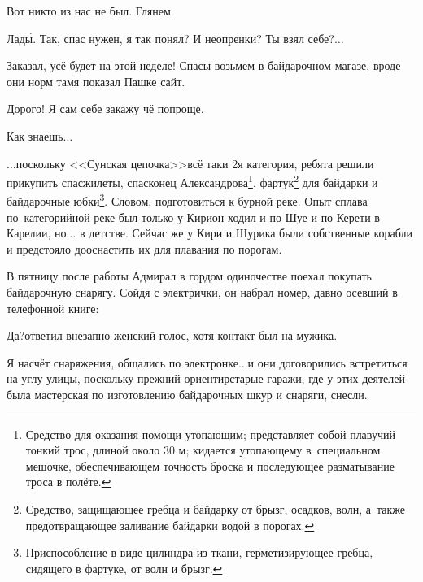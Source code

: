 \diagdash Вот никто из нас не был. Глянем.

\diagdash Лад\'{ы}. Так, спас нужен, я так понял? И неопренки? Ты взял себе?$\ldots$

\diagdash Заказал, усё будет на этой неделе! Спасы возьмем в байдарочном магазе, вроде они норм там\mdash я показал Пашке сайт.

\diagdash Дорого! Я сам себе закажу чё попроще.

\diagdash Как знаешь$\ldots$


\newpage
\renewcommand*{\thefootnote}{\arabic{footnote}}
$\ldots$поскольку <<Сунская цепочка>>\mdash всё таки 2\sdash я категория, ребята решили прикупить спасжилеты, спасконец Александрова\footnote[1]{Средство для оказания помощи утопающим; представляет собой плавучий тонкий трос, длиной около 30 м; кидается утопающему в~специальном мешочке, обеспечивающем точность броска и последующее разматывание троса в полёте.}, фартук\footnote[2]{Средство, защищающее гребца и байдарку от брызг, осадков, волн, а~также предотвращающее заливание байдарки водой в порогах.} для байдарки и байдарочные юбки\footnote[3]{Приспособление в виде цилиндра из ткани, герметизирующее гребца, сидящего в фартуке, от волн и брызг.}. Словом, подготовиться к бурной реке. Опыт сплава по~категорийной реке был только у Кири\mdash он ходил и по Шуе и по Керети в Карелии, но$\ldots$ в детстве. Сейчас же у Кири и Шурика были собственные корабли и предстояло дооснастить их для плавания по порогам. 

В пятницу после работы Адмирал в гордом одиночестве поехал покупать байдарочную снарягу. Сойдя с электрички, он набрал номер, давно осевший в телефонной книге:

\diagdash Да?\mdash ответил внезапно женский голос, хотя контакт был на мужика.

\diagdash Я насчёт снаряжения, общались по электронке$\ldots$\mdash и они договорились встретиться на углу улицы, поскольку прежний ориентир\mdash старые гаражи, где у этих деятелей была мастерская по изготовлению байдарочных шкур и снаряги, снесли.


